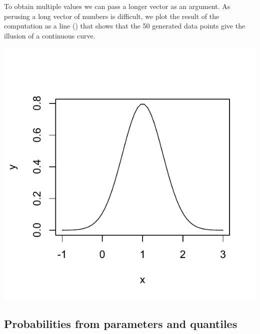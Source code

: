 \documentclass[krantz2]{krantz}\usepackage{knitr}
\begin{document}
To obtain multiple values we can pass a longer vector as an argument. As perusing a long vector of numbers is difficult, we plot the result of the computation as a line () that shows that the 50 generated data points give the illusion of a continuous curve.

\begin{knitrout}\footnotesize
{}\color{fgcolor}\begin{kframe}
\begin{alltt}
 \hlkwb{<-} \hlstd{(} \hlstd{=} \hlopt{-}\hlstd{,}  \hlstd{=} \hlstd{,}  \hlstd{=} \hlstd{)}

 \hlkwb{<-} \hlstd{(} 
                       \hlstd{=} \hlstd{(}   \hlstd{=} \hlstd{,}  \hlstd{=} \hlstd{))}
\hlopt{~}    \hlstd{=} \hlstd{)}
\end{alltt}
\end{kframe}

{\centering \includegraphics[width=.54\textwidth]{figure/pos-distrib-01a-1} 

}



\end{knitrout}

\subsection{Probabilities from parameters and quantiles}\label{sec:prob:quant}
\end{document}
